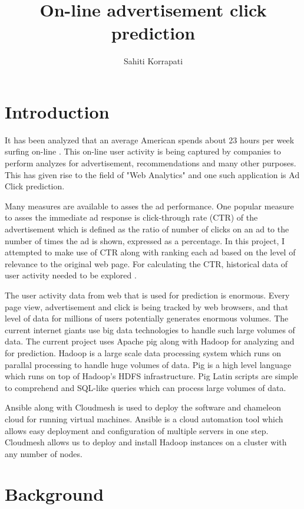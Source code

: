 \documentclass[9pt,twocolumn,twoside]{../../styles/osajnl}
\title{ On-line advertisement click prediction }
\author[1,*]{Sahiti Korrapati}
\affil[1]{School of Informatics and Computing, Bloomington, IN 47408, U.S.A.}
\affil[*]{Corresponding authors: sakorrap@iu.edu, S17-IR-2013}
\begin{document}
\maketitle

\section{Introduction}
It has been analyzed that an average American spends about 23 hours per week surfing on-line \cite{news-social-media}. This on-line user activity is being captured by companies to perform analyzes for advertisement, recommendations and many other purposes. This has given rise to the field of "Web Analytics" and one such application is Ad Click prediction.

Many measures are available to asses the ad performance. One popular measure to asses the immediate ad response is click-through rate (CTR) of the advertisement \cite{dictionary-clickThrough} which is defined as the ratio of number of clicks on an ad to the number of times the ad is shown, expressed as a percentage. In this project, I attempted to make use of CTR along with ranking each ad based on the level of relevance to the original web page. For calculating the CTR, historical data of user activity needed to be explored \cite{wiki-clickThrough}.

The user activity data from web that is used for prediction is enormous. Every page view, advertisement and click is being tracked by web browsers, and that level of data for millions of users potentially generates enormous volumes. The current internet giants use big data technologies to handle such large volumes of data. The current project uses Apache pig along with Hadoop for analyzing and for prediction. Hadoop is a large scale data processing system which runs on parallal processing to handle huge volumes of data. Pig is a high level language which runs on top of Hadoop's HDFS infrastructure. Pig Latin scripts are simple to comprehend and SQL-like queries which can process large volumes of data.

Ansible along with Cloudmesh is used to deploy the software and chameleon cloud for running virtual machines. Ansible is a cloud automation tool which allows easy deployment and configuration of multiple servers in one step. Cloudmesh allows us to deploy and install Hadoop instances on a cluster with any number of nodes.

\section{Background}
\end{document}
